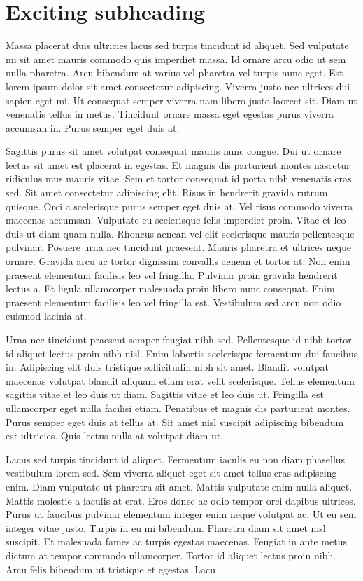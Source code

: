 \section*{Exciting subheading}

Massa placerat duis ultricies lacus sed turpis tincidunt id aliquet. Sed vulputate mi sit amet mauris commodo quis imperdiet massa. Id ornare arcu odio ut sem nulla pharetra. Arcu bibendum at varius vel pharetra vel turpis nunc eget. Est lorem ipsum dolor sit amet consectetur adipiscing. Viverra justo nec ultrices dui sapien eget mi. Ut consequat semper viverra nam libero justo laoreet sit. Diam ut venenatis tellus in metus. Tincidunt ornare massa eget egestas purus viverra accumsan in. Purus semper eget duis at.

Sagittis purus sit amet volutpat consequat mauris nunc congue. Dui ut ornare lectus sit amet est placerat in egestas. Et magnis dis parturient montes nascetur ridiculus mus mauris vitae. Sem et tortor consequat id porta nibh venenatis cras sed. Sit amet consectetur adipiscing elit. Risus in hendrerit gravida rutrum quisque. Orci a scelerisque purus semper eget duis at. Vel risus commodo viverra maecenas accumsan. Vulputate eu scelerisque felis imperdiet proin. Vitae et leo duis ut diam quam nulla. Rhoncus aenean vel elit scelerisque mauris pellentesque pulvinar. Posuere urna nec tincidunt praesent. Mauris pharetra et ultrices neque ornare. Gravida arcu ac tortor dignissim convallis aenean et tortor at. Non enim praesent elementum facilisis leo vel fringilla. Pulvinar proin gravida hendrerit lectus a. Et ligula ullamcorper malesuada proin libero nunc consequat. Enim praesent elementum facilisis leo vel fringilla est. Vestibulum sed arcu non odio euismod lacinia at.

Urna nec tincidunt praesent semper feugiat nibh sed. Pellentesque id nibh tortor id aliquet lectus proin nibh nisl. Enim lobortis scelerisque fermentum dui faucibus in. Adipiscing elit duis tristique sollicitudin nibh sit amet. Blandit volutpat maecenas volutpat blandit aliquam etiam erat velit scelerisque. Tellus elementum sagittis vitae et leo duis ut diam. Sagittis vitae et leo duis ut. Fringilla est ullamcorper eget nulla facilisi etiam. Penatibus et magnis dis parturient montes. Purus semper eget duis at tellus at. Sit amet nisl suscipit adipiscing bibendum est ultricies. Quis lectus nulla at volutpat diam ut.

Lacus sed turpis tincidunt id aliquet. Fermentum iaculis eu non diam phasellus vestibulum lorem sed. Sem viverra aliquet eget sit amet tellus cras adipiscing enim. Diam vulputate ut pharetra sit amet. Mattis vulputate enim nulla aliquet. Mattis molestie a iaculis at erat. Eros donec ac odio tempor orci dapibus ultrices. Purus ut faucibus pulvinar elementum integer enim neque volutpat ac. Ut eu sem integer vitae justo. Turpis in eu mi bibendum. Pharetra diam sit amet nisl suscipit. Et malesuada fames ac turpis egestas maecenas. Feugiat in ante metus dictum at tempor commodo ullamcorper. Tortor id aliquet lectus proin nibh. Arcu felis bibendum ut tristique et egestas. Lacu

